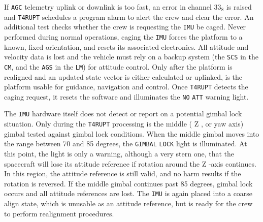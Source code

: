 \documentclass[refcap, oxford]{ahsan}
\begin{document}
If \texttt{AGC} telemetry uplink or downlink is too fast, an error in channel $33_{8}$ is raised and \texttt{T4RUPT} schedules a program alarm to alert the crew and clear the error. An additional test checks whether the crew is requesting the \texttt{IMU} be caged. Never performed during normal operations, caging the \texttt{IMU} forces the platform to a known, fixed orientation, and resets its associated electronics. All attitude and velocity data is lost and the vehicle must rely on a backup system (the \texttt{SCS} in the \texttt{CM}, and the \texttt{AGS} in the \texttt{LM}) for attitude control. Only after the platform is realigned and an updated state vector is either calculated or uplinked, is the platform usable for guidance, navigation and control. Once \texttt{T4RUPT} detects the caging request, it resets the software and illuminates the \texttt{NO} \texttt{ATT} warning light.

The \texttt{IMU} hardware itself does not detect or report on a potential gimbal lock\\
situation. Only during the \texttt{T4RUPT} processing is the middle ( Z , or yaw axis) gimbal tested against gimbal lock conditions. When the middle gimbal moves into the range between 70 and 85 degrees, the \texttt{GIMBAL} \texttt{LOCK} light is illuminated. At this point, the light is only a warning, although a very stern one, that the spacecraft will lose its attitude reference if rotation around the Z -axis continues. In this region, the attitude reference is still valid, and no harm results if the rotation is reversed. If the middle gimbal continues past 85 degrees, gimbal lock occurs and all attitude references are lost. The \texttt{IMU} is again placed into a coarse align state, which is unusable as an attitude reference, but is ready for the crew to perform realignment procedures.
\end{document}
